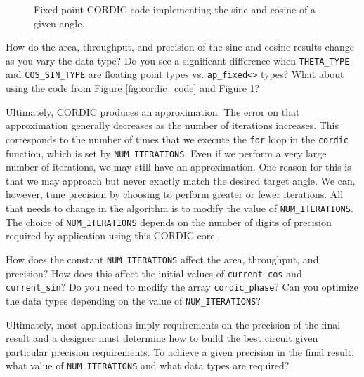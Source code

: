 \begin{figure}

\caption{Fixed-point CORDIC code implementing the sine and cosine of a given angle.}\label{fig:cordic_fixed_code}
\end{figure}

\begin{exercise}
How do the area, throughput, and precision of the sine and cosine results change as you vary the data type?  Do you see a significant difference when \lstinline{THETA_TYPE} and \lstinline{COS_SIN_TYPE} are floating point types vs. \lstinline{ap_fixed<>} types?  What about using the code from Figure \ref{fig:cordic_code} and Figure \ref{fig:cordic_fixed_code}?
\end{exercise}

Ultimately, CORDIC produces an approximation. The error on that approximation generally decreases as the number of iterations increases. This corresponds to the number of times that we execute the \lstinline{for} loop in the \lstinline{cordic} function, which is set by \lstinline{NUM_ITERATIONS}.  Even if we perform a very large number of iterations, we may still have an approximation. One reason for this is that we may approach but never exactly match the desired target angle. We can, however, tune precision by choosing to perform greater or fewer iterations. All that needs to change in the algorithm is to modify the value of \lstinline{NUM_ITERATIONS}. The choice of \lstinline{NUM_ITERATIONS} depends on the number of digits of precision required by application using this CORDIC core.

\begin{exercise}
How does the constant \lstinline{NUM_ITERATIONS} affect the area, throughput, and precision? How does this affect the initial values of \lstinline{current_cos} and \lstinline{current_sin}? Do you need to modify the array \lstinline{cordic_phase}? Can you optimize the data types depending on the value of \lstinline{NUM_ITERATIONS}?
\end{exercise}

\begin{exercise}
Ultimately, most applications imply requirements on the precision of the final result and a designer must determine how to build the best circuit given particular precision requirements.  To achieve a given precision in the final result, what value of \lstinline{NUM_ITERATIONS} and what data types are required?
\end{exercise}

